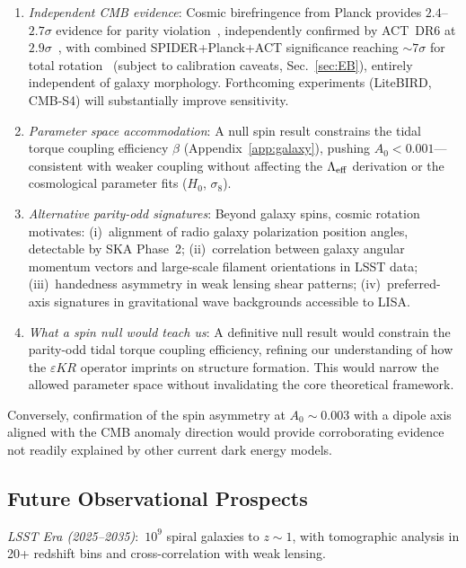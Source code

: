 \documentclass[aps,prd,twocolumn,superscriptaddress,showpacs,preprintnumbers,nofootinbib,longbibliography,floatfix]{revtex4-2}
\newcommand{\Leff}{\Lambda_{\rm eff}}
\begin{document}
\begin{enumerate}[leftmargin=*]
\item \textit{Independent CMB evidence}: Cosmic birefringence from Planck provides $2.4$--$2.7\sigma$ evidence for parity violation~\cite{Minami2020,Eskilt2022}, independently confirmed by ACT~DR6 at $2.9\sigma$~\cite{DiegoPalazuelos2025}, with combined SPIDER+Planck+ACT significance reaching ${\sim}7\sigma$ for total rotation~\cite{SPIDER2025} (subject to calibration caveats, Sec.~\ref{sec:EB}), entirely independent of galaxy morphology. Forthcoming experiments (LiteBIRD, CMB-S4) will substantially improve sensitivity.

\item \textit{Parameter space accommodation}: A null spin result constrains the tidal torque coupling efficiency $\beta$ (Appendix~\ref{app:galaxy}), pushing $A_0 < 0.001$---consistent with weaker coupling without affecting the $\Leff$ derivation or the cosmological parameter fits ($H_0$, $\sigma_8$).

\item \textit{Alternative parity-odd signatures}: Beyond galaxy spins, cosmic rotation motivates: (i)~alignment of radio galaxy polarization position angles, detectable by SKA Phase~2; (ii)~correlation between galaxy angular momentum vectors and large-scale filament orientations in LSST data; (iii)~handedness asymmetry in weak lensing shear patterns; (iv)~preferred-axis signatures in gravitational wave backgrounds accessible to LISA.

\item \textit{What a spin null would teach us}: A definitive null result would constrain the parity-odd tidal torque coupling efficiency, refining our understanding of how the $\varepsilon KR$ operator imprints on structure formation. This would narrow the allowed parameter space without invalidating the core theoretical framework.
\end{enumerate}

Conversely, confirmation of the spin asymmetry at $A_0 \sim 0.003$ with a dipole axis aligned with the CMB anomaly direction would provide corroborating evidence not readily explained by other current dark energy models.

\subsection{Future Observational Prospects}

\textit{LSST Era (2025--2035)}:~$10^9$ spiral galaxies to $z \sim 1$, with tomographic analysis in 20+ redshift bins and cross-correlation with weak lensing.
\end{document}
